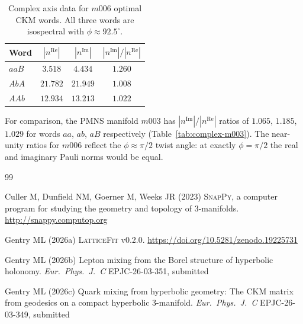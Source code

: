 ﻿\documentclass[epjc3]{svjour3}
\begin{document}
\begin{table}[ht]
\caption{Complex axis data for $m006$ optimal CKM words.  All three
  words are isospectral with $\phi \approx 92.5^\circ$.}
\label{tab:complex-m006}
\centering
\begin{tabular}{lccc}
\toprule
Word & $|n^{\mathrm{Re}}|$ & $|n^{\mathrm{Im}}|$
     & $|n^{\mathrm{Im}}|/|n^{\mathrm{Re}}|$ \\
\midrule
$aaB$ & $3.518$  & $4.434$  & $1.260$ \\
$AbA$ & $21.782$ & $21.949$ & $1.008$ \\
$AAb$ & $12.934$ & $13.213$ & $1.022$ \\
\bottomrule
\end{tabular}
\end{table}

For comparison, the PMNS manifold $m003$ has
$|n^{\mathrm{Im}}|/|n^{\mathrm{Re}}|$ ratios of $1.065$, $1.185$,
$1.029$ for words $aa$, $ab$, $aB$ respectively
(Table~\ref{tab:complex-m003}).  The near-unity ratios for $m006$
reflect the $\phi \approx \pi/2$ twist angle: at exactly
$\phi = \pi/2$ the real and imaginary Pauli norms would be equal.

\begin{thebibliography}{99}

Culler M, Dunfield NM, Goerner M, Weeks JR (2023)
\textsc{SnapPy}, a computer program for studying the geometry and
topology of 3-manifolds.
\url{http://snappy.computop.org}

Gentry ML (2026a)
\textsc{LatticeFit} v0.2.0.
\url{https://doi.org/10.5281/zenodo.19225731}

Gentry ML (2026b)
Lepton mixing from the Borel structure of hyperbolic holonomy.
\textit{Eur.\ Phys.\ J.\ C} EPJC-26-03-351, submitted

Gentry ML (2026c)
Quark mixing from hyperbolic geometry: The CKM matrix from geodesics
on a compact hyperbolic 3-manifold.
\textit{Eur.\ Phys.\ J.\ C} EPJC-26-03-349, submitted

\end{thebibliography}
\end{document}
